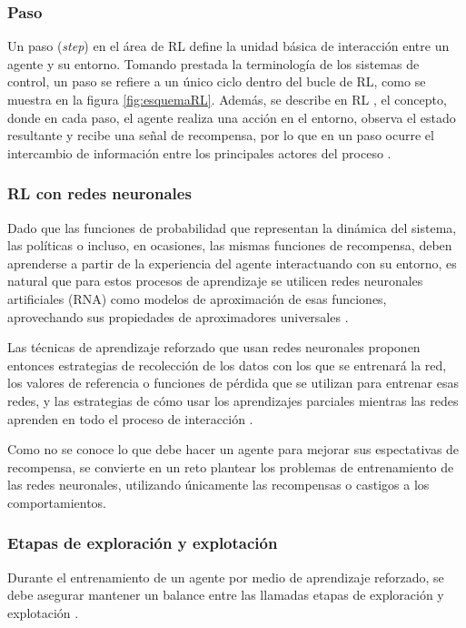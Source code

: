 \subsubsection{Paso}

Un paso (\textit{step}) en el área de RL define la unidad básica de interacción entre un agente y su entorno. Tomando prestada la terminología de los sistemas de control, un paso se refiere a un único ciclo dentro del bucle de RL, como se muestra en la figura \ref{fig:esquemaRL}. Además, se describe en RL \cite{RLIntro}, el concepto, donde en cada paso, el agente realiza una acción en el entorno, observa el estado resultante y recibe una señal de recompensa, por lo que en un paso ocurre el intercambio de información entre los principales actores del proceso \cite{DataScience}.


\subsubsection{RL con redes neuronales}

Dado que las funciones de probabilidad que representan la dinámica del sistema, las políticas o incluso, en ocasiones, las mismas funciones de recompensa, deben aprenderse a partir de la experiencia del agente interactuando con su entorno, es natural que para estos procesos de aprendizaje se utilicen redes neuronales artificiales (RNA) como modelos de aproximación de esas funciones, aprovechando sus propiedades de aproximadores universales \cite{RLIntro}.

Las técnicas de aprendizaje reforzado que usan redes neuronales proponen entonces estrategias de recolección de los datos con los que se entrenará la red, los valores de referencia o funciones de pérdida que se utilizan para entrenar esas redes, y las estrategias de cómo usar los aprendizajes parciales mientras las redes aprenden en todo el proceso de interacción \cite{RLIntro}.

Como no se conoce lo que debe hacer un agente para mejorar sus espectativas de recompensa, se convierte en un reto plantear los problemas de entrenamiento de las redes neuronales, utilizando únicamente las recompensas o castigos a los comportamientos.


\subsubsection{Etapas de exploración y explotación}

Durante el entrenamiento de un agente por medio de aprendizaje reforzado, se debe asegurar mantener un balance entre las llamadas etapas de exploración y explotación \cite{RLIntro}.


